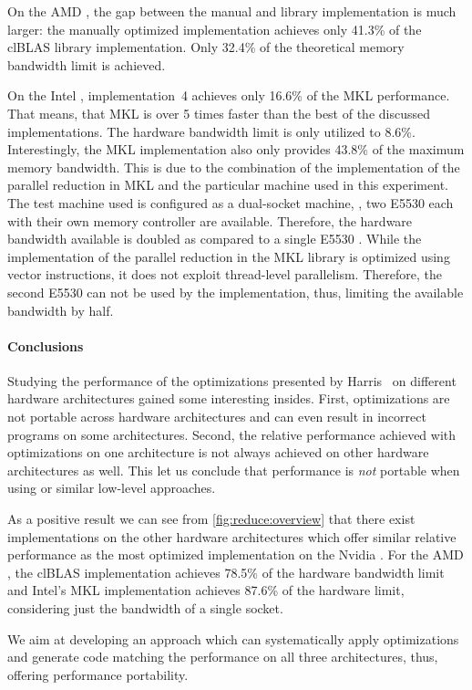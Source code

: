 On the AMD \GPU, the gap between the manual and library implementation is much larger:
the manually optimized implementation achieves only 41.3\% of the clBLAS library implementation.
Only 32.4\% of the theoretical memory bandwidth limit is achieved.

On the Intel \CPU, implementation~4 achieves only 16.6\% of the MKL performance.
That means, that MKL is over 5 times faster than the best of the discussed implementations.
The hardware bandwidth limit is only utilized to 8.6\%.
Interestingly, the MKL implementation also only provides 43.8\% of the maximum memory bandwidth.
This is due to the combination of the implementation of the parallel reduction in MKL and the particular machine used in this experiment.
The test machine used is configured as a dual-socket machine, \ie, two E5530 \CPUs each with their own memory controller are available.
Therefore, the hardware bandwidth available is doubled as compared to a single E5530 \CPU.
While the implementation of the parallel reduction in the MKL library is optimized using vector instructions, it does not exploit thread-level parallelism.
Therefore, the second E5530 \CPU can not be used by the implementation, thus, limiting the available bandwidth by half.

\paragraph{Conclusions}
Studying the performance of the optimizations presented by Harris~\cite{Harris2007} on different hardware architectures gained some interesting insides.
First, optimizations are not portable across hardware architectures and can even result in incorrect programs on some architectures.
Second, the relative performance achieved with optimizations on one architecture is not always achieved on other hardware architectures as well.
This let us conclude that performance is \emph{not} portable when using \OpenCL or similar low-level approaches.

As a positive result we can see from \autoref{fig:reduce:overview} that there exist implementations on the other hardware architectures which offer similar relative performance as the most optimized implementation on the Nvidia \GPU.
For the AMD \GPU, the clBLAS implementation achieves 78.5\% of the hardware bandwidth limit and Intel's MKL implementation achieves 87.6\% of the hardware limit, considering just the bandwidth of a single \CPU socket.

We aim at developing an approach which can systematically apply optimizations and generate code matching the performance on all three architectures, thus, offering performance portability.


